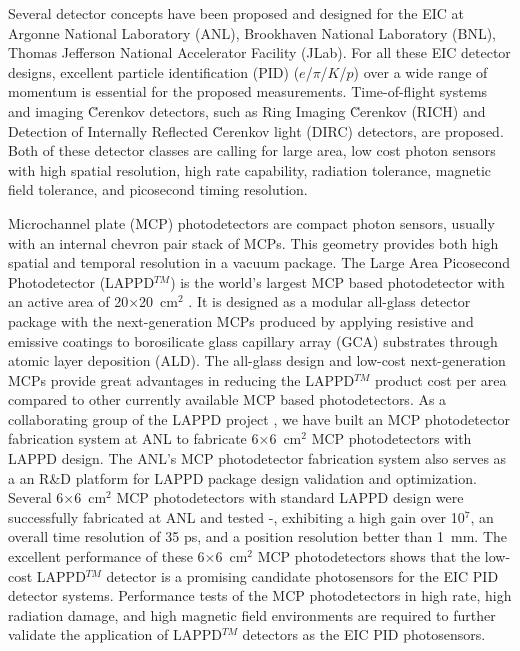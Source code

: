 \documentclass[preprint,5p]{elsarticle}
\begin{document}
Several detector concepts have been proposed and designed for the EIC at 
Argonne National Laboratory (ANL), Brookhaven National Laboratory (BNL), Thomas 
Jefferson National Accelerator Facility (JLab). For all these EIC detector 
designs, excellent particle identification (PID) ($e$/$\pi$/$K$/$p$) over a 
wide range of momentum is essential for the proposed measurements.  
Time-of-flight systems and imaging \u Cerenkov detectors, such as Ring Imaging 
\u Cerenkov (RICH)\cite{RICH,RICH2} and Detection of Internally Reflected \u 
Cerenkov light (DIRC) \cite{DRIC} detectors, are proposed. Both of these 
detector classes are calling for large area, low cost photon sensors with high 
spatial resolution, high rate capability, radiation tolerance, magnetic field 
tolerance, and picosecond timing resolution. 

Microchannel plate (MCP) photodetectors are compact photon sensors, usually 
with an internal chevron pair stack of MCPs. This  geometry provides both high 
spatial and temporal resolution in a vacuum package. The Large Area Picosecond 
Photodetector (LAPPD$^{TM}$) is the world's largest MCP based photodetector 
with an active area of 20$\times$20~cm$^2$ \cite{LAPPD}. It is designed as a 
modular all-glass detector package with the next-generation MCPs produced by 
applying resistive and emissive coatings to borosilicate glass capillary array 
(GCA) substrates through atomic layer deposition (ALD). The all-glass design 
and low-cost next-generation MCPs provide great advantages in reducing the 
LAPPD$^{TM}$ product cost per area compared to other currently available MCP 
based photodetectors. As a collaborating group of the LAPPD project 
\cite{LAPPD2}, we have built an MCP photodetector fabrication system 
\cite{LAPPD-ANL} at ANL to fabricate 6$\times$6~cm$^2$ MCP photodetectors with 
LAPPD design. The ANL's MCP photodetector fabrication system also serves as a 
an R{\&}D platform for LAPPD package design validation and optimization. 
Several 6$\times$6~cm$^2$ MCP photodetectors with standard LAPPD design were 
successfully fabricated at ANL and tested \cite{ANL-MCPs}-\cite{Wang-MCPs2}, 
exhibiting a high gain over 10$^7$, an overall time resolution of 35 ps, and a 
position resolution better than 1~mm. The excellent performance of these 
6$\times$6~cm$^2$ MCP photodetectors shows that the low-cost LAPPD$^{TM}$ 
detector is a promising candidate photosensors for the EIC PID detector 
systems. Performance tests of the MCP photodetectors in high rate, high 
radiation damage, and high magnetic field environments are required to further 
validate the application of LAPPD$^{TM}$ detectors as the EIC PID photosensors. 
\end{document}
